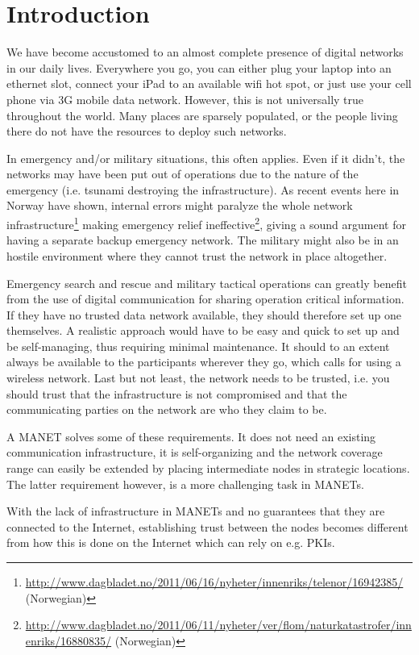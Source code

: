 \chapter{Introduction}
\label{ch:intro}
\acresetall
We have become accustomed to an almost complete presence of digital networks
in our daily lives. Everywhere you go, you can either plug your laptop into an
ethernet slot, connect your iPad to an available wifi hot spot, or just use
your cell phone via 3G mobile data network. However, this is not universally
true throughout the world. Many places are sparsely populated, or the people
living there do not have the resources to deploy such networks.

In emergency and/or military situations, this often applies. Even if it didn't,
the networks may have been put out of operations due to the nature of the
emergency (i.e. tsunami destroying the infrastructure). As recent events
here in Norway have shown, internal errors might paralyze the whole network 
infrastructure\footnote{\url{http://www.dagbladet.no/2011/06/16/nyheter/innenriks/telenor/16942385/}
(Norwegian)} making emergency relief ineffective\footnote{\url{http://www.dagbladet.no/2011/06/11/nyheter/ver/flom/naturkatastrofer/innenriks/16880835/}
(Norwegian)}, giving a sound argument for having a separate backup emergency
network. The military might also be in an hostile environment where they cannot trust
the network in place altogether.

Emergency search and rescue and military tactical operations can greatly benefit
from the use of digital communication for sharing operation critical
information. If they have no trusted data network available, they should
therefore set up one themselves. A realistic approach would have to be easy and
quick to set up and be self-managing, thus requiring minimal maintenance. It
should to an extent always be available to the participants wherever they go,
which calls for using a wireless network. Last but not least, the network needs
to be trusted, i.e. you should trust that the infrastructure is not compromised
and that the communicating parties on the network are who they claim to be.

A \ac{MANET} solves some of these requirements. It does not need an existing
communication infrastructure, it is self-organizing and the network coverage
range can easily be extended by placing intermediate nodes in strategic
locations. The latter requirement however, is a more challenging task in
\acp{MANET}.

With the lack of infrastructure in \acp{MANET} and no guarantees that they are
connected to the Internet, establishing trust between the nodes becomes
different from how this is done on the Internet which can rely on e.g.
\acp{PKI}.

